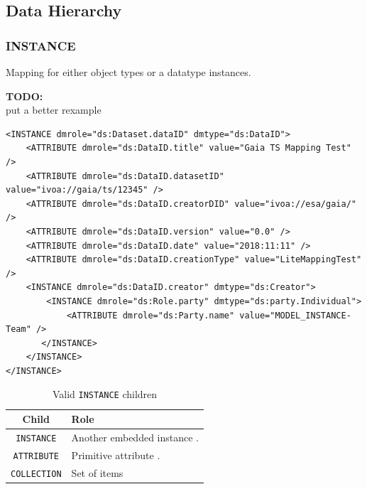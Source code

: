 \documentclass[11pt,a4paper]{ivoa}
\newcommand{\TODO}[1]{%
    \noindent%
    \colorbox{todocolor}{%
            \parbox{0.85\linewidth}{\sffamily \textbf{TODO:}\\
            #1}
    }%
    \vspace{2pt}

}
\begin{document}
%
%
\subsection{Data Hierarchy}

%
%

\subsubsection{INSTANCE}

Mapping for either object types or a datatype instances.

\TODO{ put a better rexample}

\begin{lstlisting}[caption={INSTANCE block example},style=XML]
<INSTANCE dmrole="ds:Dataset.dataID" dmtype="ds:DataID">
    <ATTRIBUTE dmrole="ds:DataID.title" value="Gaia TS Mapping Test" />
    <ATTRIBUTE dmrole="ds:DataID.datasetID" value="ivoa://gaia/ts/12345" />
    <ATTRIBUTE dmrole="ds:DataID.creatorDID" value="ivoa://esa/gaia/" />
    <ATTRIBUTE dmrole="ds:DataID.version" value="0.0" />
    <ATTRIBUTE dmrole="ds:DataID.date" value="2018:11:11" />
    <ATTRIBUTE dmrole="ds:DataID.creationType" value="LiteMappingTest" />
    <INSTANCE dmrole="ds:DataID.creator" dmtype="ds:Creator">
        <INSTANCE dmrole="ds:Role.party" dmtype="ds:party.Individual">
            <ATTRIBUTE dmrole="ds:Party.name" value="MODEL_INSTANCE-Team" />
       </INSTANCE>
    </INSTANCE>
</INSTANCE>
\end{lstlisting}


\begin{table}[!htbp]
\small
\centering
\begin{tabulary}{\linewidth}{|c|J|}       
       \hline 
           \textbf{Child} &  
           \textbf{Role} \\
       \hline         \hline  
           \texttt{INSTANCE}    & 
           Another embedded instance . \\       
       \hline  
           \texttt{ATTRIBUTE}    & 
           Primitive attribute . \\       
       \hline  
            \texttt{COLLECTION}    & 
           Set of items\\      
       \hline 
     \end{tabulary}
     \caption{Valid  \texttt{INSTANCE} children} 
     \label{tbl:inst-chilrdren}
\end{table}
\end{document}
